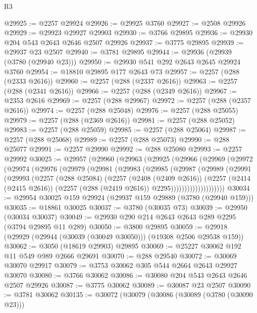 \begin{lexlean}{R3}
\begin{coremodule}
@29925 := @2257 @29924
@29926 := @29925 @3760
@29927 := @2508 @29926
@29929 := @29923 @29927 @29903
@29930 := @3766 @29895
@29936 := @29930 @204 @543 @2643 @2646 @2507 @29926
@29937 := @3775 @29895
@29939 := @29937 @23 @2507
@29940 := @3781 @29895
@29944 := @29936 (@29939 (@3780 (@29940 @23)))
@29950 := @29930 @541 @292 @2643 @2645 @29924 @3760
@29954 := @18810 @29895 @177 @2643 @73
@29957 := @2257 (@288 (@2333 @2616))
@29960 := @2257 (@288 (@2337 @2616))
@29963 := @2257 (@288 (@2341 @2616))
@29966 := @2257 (@288 (@2349 @2616))
@29967 := @2353 @2616
@29969 := @2257 (@288 @29967)
@29972 := @2257 (@288 (@2357 @2616))
@29974 := @2257 (@288 @25048)
@29976 := @2257 (@288 @25055)
@29979 := @2257 (@288 (@2369 @2616))
@29981 := @2257 (@288 @25052)
@29983 := @2257 (@288 @25059)
@29985 := @2257 (@288 @25064)
@29987 := @2257 (@288 @25068)
@29989 := @2257 (@288 @25073)
@29990 := @288 @25077
@29991 := @2257 @29990
@29992 := @288 @25080
@29993 := @2257 @29992
@30025 := @29957
    (@29960
      (@29963
        (@29925
          (@29966
            (@29969
              (@29972
                (@29974
                  (@29976
                    (@29979
                      (@29981
                        (@29983
                          (@29985
                            (@29987
                              (@29989
                                (@29991
                                  (@29993
                                    (@2257
                                      (@288 @25084)
                                      (@2257
                                        (@2408 (@2409 @2616))
                                        (@2257
                                          (@2414 (@2415 @2616))
                                          (@2257 (@288 (@2419 @2616)) @2295))))))))))))))))))))
@30034 := @29954 @30025 @159 @29924 (@29937 @159 @29889 (@3780 (@29940 @159)))
@30035 := @18861 @30025
@30037 := @3780 (@30035 @73)
@30039 := @29950 (@30034 @30037)
@30049 := @29930 @290 @214 @2643 @2643 @289 @2295 (@3794 @29895 @11 @289)
@30050 := @3800 @29895
@30059 := @29918 (@29929 (@29944 (@30039 (@30049 @30050))) (@19308 @2506 @29538 @159))
@30062 := @3050 (@18619 @29903) @29895
@30069 := @25227 @30062 @192 @11 @549 @989 @2666 @29691
@30070 := @288 @29540
@30072 := @30069 @30070 @29917
@30079 := @3753 @30062 @305 @544 @2664 @2643 @29927 @30070
@30080 := @3766 @30062
@30086 := @30080 @204 @543 @2643 @2646 @2507 @29926
@30087 := @3775 @30062
@30089 := @30087 @23 @2507
@30090 := @3781 @30062
@30135 := @30072
    (@30079
      (@30086
        (@30089 (@3780 (@30090 @23)))

\end{coremodule}
\end{lexlean}
